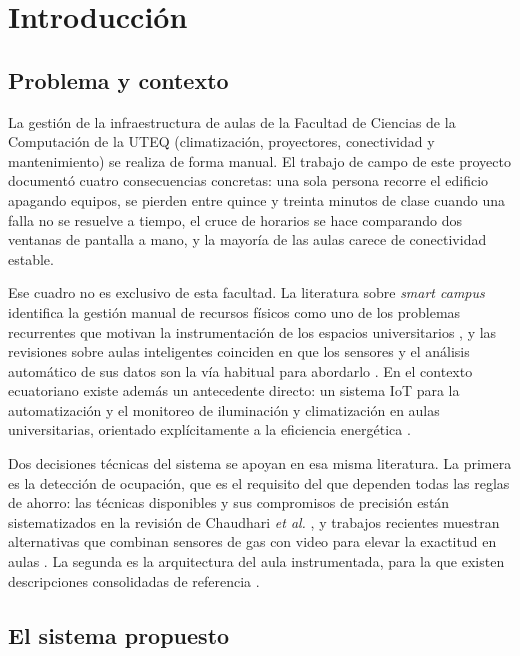 \section{Introducci\'on}

\subsection{Problema y contexto}

La gesti\'on de la infraestructura de aulas de la Facultad de Ciencias de la Computaci\'on de la UTEQ (climatizaci\'on, proyectores, conectividad y mantenimiento) se realiza de forma manual. El trabajo de campo de este proyecto document\'o cuatro consecuencias concretas: una sola persona recorre el edificio apagando equipos, se pierden entre quince y treinta minutos de clase cuando una falla no se resuelve a tiempo, el cruce de horarios se hace comparando dos ventanas de pantalla a mano, y la mayor\'ia de las aulas carece de conectividad estable.

Ese cuadro no es exclusivo de esta facultad. La literatura sobre \emph{smart campus} identifica la gesti\'on manual de recursos f\'isicos como uno de los problemas recurrentes que motivan la instrumentaci\'on de los espacios universitarios \cite{polin2023smartcampus}, y las revisiones sobre aulas inteligentes coinciden en que los sensores y el an\'alisis autom\'atico de sus datos son la v\'ia habitual para abordarlo \cite{zhang2024smartclassrooms,talu2025exploring}. En el contexto ecuatoriano existe adem\'as un antecedente directo: un sistema IoT para la automatizaci\'on y el monitoreo de iluminaci\'on y climatizaci\'on en aulas universitarias, orientado expl\'icitamente a la eficiencia energ\'etica \cite{delgado2026riemat}.

Dos decisiones t\'ecnicas del sistema se apoyan en esa misma literatura. La primera es la detecci\'on de ocupaci\'on, que es el requisito del que dependen todas las reglas de ahorro: las t\'ecnicas disponibles y sus compromisos de precisi\'on est\'an sistematizados en la revisi\'on de Chaudhari \emph{et al.} \cite{chaudhari2024fundamentals}, y trabajos recientes muestran alternativas que combinan sensores de gas con video para elevar la exactitud en aulas \cite{challa2025gas}. La segunda es la arquitectura del aula instrumentada, para la que existen descripciones consolidadas de referencia \cite{kurni2025iot}.

\subsection{El sistema propuesto}

